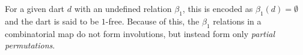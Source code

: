 For a given dart $d$ with an undefined relation $\beta_1$, this is encoded as $\beta_1(d) = \emptyset$ and the dart is said to be $1$-free.
Because of this, the $\beta_1$ relations in a combinatorial map do not form involutions, but instead form only \emph{partial permutations}.
